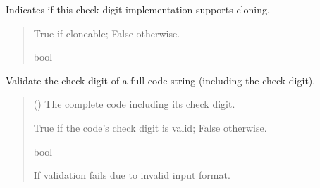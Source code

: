 \documentclass[letterpaper,10pt,english]{sphinxmanual}
\begin{document}
\begin{fulllineitems}
\begin{fulllineitems}
\label{\detokenize{apache_commons_validator_python.routines.checkdigit:id0}}
\pysigstartsignatures
{}
\pysigstopsignatures
\sphinxAtStartPar
Indicates if this check digit implementation supports cloning.
\begin{quote}\begin{description}
\sphinxAtStartPar
True if cloneable; False otherwise.

\sphinxAtStartPar
bool

\end{description}\end{quote}

\end{fulllineitems}


\begin{fulllineitems}
\label{\detokenize{apache_commons_validator_python.routines.checkdigit:apache_commons_validator_python.routines.checkdigit.checkdigit.CheckDigit.is_valid}}
\pysigstartsignatures
{}
\pysigstopsignatures
\sphinxAtStartPar
Validate the check digit of a full code string (including the check digit).
\begin{quote}\begin{description}
\sphinxAtStartPar
{} () \textendash{} The complete code including its check digit.

\sphinxAtStartPar
True if the code’s check digit is valid; False otherwise.

\sphinxAtStartPar
bool

\sphinxAtStartPar
{\hyperref[\detokenize{apache_commons_validator_python.routines.checkdigit:apache_commons_validator_python.routines.checkdigit.checkdigit_exception.CheckDigitException}]{}} \textendash{} If validation fails due to invalid input format.


\end{description}
\end{quote}
\end{fulllineitems}
\end{fulllineitems}
\end{document}
